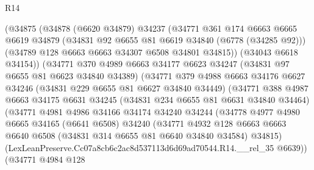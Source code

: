 \begin{lexlean}{R14}
\begin{coremodule}
                    (@34875
                      (@34878
                        (@6620 @34879)
                        @34237
                        (@34771
                          @361
                          @174
                          @6663
                          @6665
                          @6619
                          @34879
                          (@34831 @92 @6655 @81 @6619 @34840 (@6778 (@34285 @92)))
                          (@34789 @128 @6663 @6663 @34307 @6508 @34801 @34815))
                        (@34043 @6618 @34154))
                      (@34771
                        @370
                        @4989
                        @6663
                        @34177
                        @6623
                        @34247
                        (@34831 @97 @6655 @81 @6623 @34840 @34389)
                        (@34771
                          @379
                          @4988
                          @6663
                          @34176
                          @6627
                          @34246
                          (@34831 @229 @6655 @81 @6627 @34840 @34449)
                          (@34771
                            @388
                            @4987
                            @6663
                            @34175
                            @6631
                            @34245
                            (@34831 @234 @6655 @81 @6631 @34840 @34464)
                            (@34771
                              @4981
                              @4986
                              @34166
                              @34174
                              @34240
                              @34244
                              (@34778
                                @4977
                                @4980
                                @6665
                                @34165
                                (@6641 @6508)
                                @34240
                                (@34771
                                  @4932
                                  @128
                                  @6663
                                  @6663
                                  @6640
                                  @6508
                                  (@34831 @314 @6655 @81 @6640 @34840 @34584)
                                  @34815)
                                (LexLeanPreserve.Cc07a8cb6c2ac8d537113d6d69ad70544.R14.__rel_35
                                  @6639))
                              (@34771
                                @4984
                                @128

\end{coremodule}
\end{lexlean}
